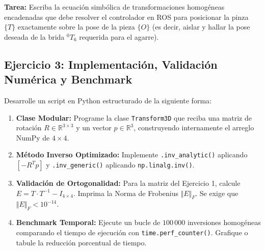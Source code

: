 \documentclass[11pt, a4paper]{article}
\begin{document}
\noindent\textbf{Tarea:} Escriba la ecuación simbólica de transformaciones homogéneas encadenadas que debe resolver el controlador en ROS para posicionar la pinza $\{T\}$ exactamente sobre la pose de la pieza $\{O\}$ (es decir, aislar y hallar la pose deseada de la brida $^{0}T_6$ requerida para el agarre).

\subsection*{Ejercicio 3: Implementación, Validación Numérica y Benchmark}
Desarrolle un script en Python estructurado de la siguiente forma:
\begin{enumerate}
    \item \textbf{Clase Modular:} Programe la clase \texttt{Transform3D} que reciba una matriz de rotación $R \in \mathbb{R}^{3\times3}$ y un vector $p \in \mathbb{R}^3$, construyendo internamente el arreglo NumPy de $4 \times 4$.
    \item \textbf{Método Inverso Optimizado:} Implemente \texttt{.inv\_analytic()} aplicando $[-R^T p]$ y \texttt{.inv\_generic()} aplicando \texttt{np.linalg.inv()}.
    \item \textbf{Validación de Ortogonalidad:} Para la matriz del Ejercicio 1, calcule $E = T \cdot T^{-1} - I_{4\times4}$. Imprima la Norma de Frobenius $\Vert E \Vert_F$. Se exige que $\Vert E \Vert_F < 10^{-14}$.
    \item \textbf{Benchmark Temporal:} Ejecute un bucle de $100\,000$ inversiones homogéneas comparando el tiempo de ejecución con \texttt{time.perf\_counter()}. Grafique o tabule la reducción porcentual de tiempo.
\end{enumerate}

\newpage
\end{document}
